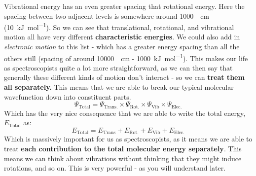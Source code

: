 \documentclass{memoir}[11pt,oneside,a4paper,openany]
\newcommand{\wf}{\ensuremath{\Psi}\xspace}
\begin{document}
Vibrational energy has an even greater spacing that rotational energy. Here the spacing between two adjacent levels is somewhere around \SI{1000}{\per\centi\metre} (\SI{10}{\kilo\joule\per\mole}). So we can see that translational, rotational, and vibrational motion all have very different \textbf{characteristic energies}. We could also add in \emph{electronic motion} to this list - which has a greater energy spacing than all the others still (spacing of around \SI{10000}{\per\centi\metre} - \SI{1000}{\kilo\joule\per\mole}). This makes our life as spectroscopists quite a lot more straightforward, as we can then say that generally these different kinds of motion don't interact - so we can \textbf{treat them all separately.} This means that we are able to break our typical molecular wavefunction down into constituent parts.
\begin{equation}
	\wf_{\text{Total}} = \wf_{\text{Trans.}} \times \wf_{\text{Rot.}} \times \wf_{\text{Vib}} \times \wf_{\text{Elec.}}
\end{equation}
Which has the very nice consequence that we are able to write the total energy, $E_\text{Total}$ as:
\begin{equation}
	E_\text{Total} = E_\text{Trans} + E_\text{Rot.} + E_\text{Vib} + E_\text{Elec.}
\end{equation}
Which is massively important for us as spectroscopists, as it means we are able to treat \textbf{each contribution to the total molecular energy separately}. This means we can think about vibrations without thinking that they might induce rotations, and so on. This is very powerful - as you will understand later.
\end{document}
